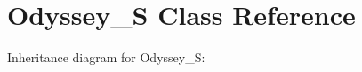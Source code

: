 \hypertarget{classOdyssey__S}{}\section{Odyssey\+\_\+S Class Reference}
\label{classOdyssey__S}


Inheritance diagram for Odyssey\+\_\+S\+:
